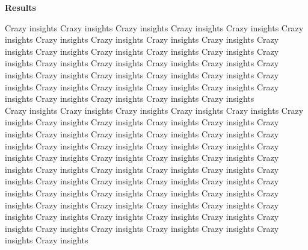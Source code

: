 \begin{center} \textbf{\huge Results} \end{center}
Crazy insights Crazy insights Crazy insights Crazy insights Crazy insights Crazy insights Crazy insights Crazy insights Crazy insights Crazy insights Crazy insights Crazy insights Crazy insights Crazy insights Crazy insights Crazy insights Crazy insights Crazy insights Crazy insights Crazy insights Crazy insights Crazy insights Crazy insights Crazy insights Crazy insights Crazy insights Crazy insights Crazy insights Crazy insights Crazy insights Crazy insights Crazy insights Crazy insights Crazy insights Crazy insights \\
Crazy insights Crazy insights Crazy insights Crazy insights Crazy insights Crazy insights Crazy insights Crazy insights Crazy insights Crazy insights Crazy insights Crazy insights Crazy insights Crazy insights Crazy insights Crazy insights Crazy insights Crazy insights Crazy insights Crazy insights Crazy insights Crazy insights Crazy insights Crazy insights Crazy insights Crazy insights Crazy insights Crazy insights Crazy insights Crazy insights Crazy insights Crazy insights Crazy insights Crazy insights Crazy insights
Crazy insights Crazy insights Crazy insights Crazy insights Crazy insights Crazy insights Crazy insights Crazy insights Crazy insights Crazy insights Crazy insights Crazy insights Crazy insights Crazy insights Crazy insights Crazy insights Crazy insights Crazy insights Crazy insights Crazy insights Crazy insights Crazy insights 
